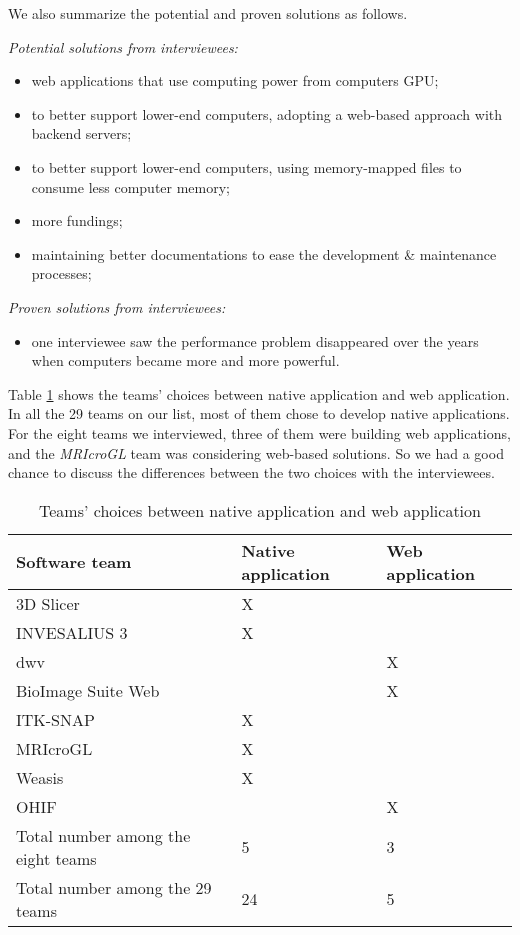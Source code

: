 We also summarize the potential and proven solutions as follows.

\textit{Potential solutions from interviewees:}
\begin{itemize}
\item web applications that use computing power from computers GPU;
\item to better support lower-end computers, adopting a web-based approach with backend servers;
\item to better support lower-end computers, using memory-mapped files to consume less computer memory;
\item more fundings;
\item maintaining better documentations to ease the development \& maintenance processes;
\end{itemize}

\textit{Proven solutions from interviewees:}
\begin{itemize}
\item one interviewee saw the performance problem disappeared over the years when computers became more and more powerful. 
\end{itemize}

Table \ref{tab_native_vs_web} shows the teams' choices between native application and web application. In all the 29 teams on our list, most of them chose to develop native applications. For the eight teams we interviewed, three of them were building web applications, and the \textit{MRIcroGL} team was considering web-based solutions. So we had a good chance to discuss the differences between the two choices with the interviewees.

\begin{table}[H]
\centering
\begin{tabular}{lll}
\hline
Software team & Native application & Web application \\ \hline
3D Slicer & X & \\
INVESALIUS 3 & X & \\
dwv & & X \\
BioImage Suite Web & & X \\
ITK-SNAP & X & \\
MRIcroGL & X & \\
Weasis & X & \\
OHIF & & X \\ \hdashline
Total number among the eight teams & 5 & 3 \\
Total number among the 29 teams & 24 & 5 \\ \hline
\end{tabular}
\caption{\label{tab_native_vs_web}Teams' choices between native application and web application}
\end{table}

